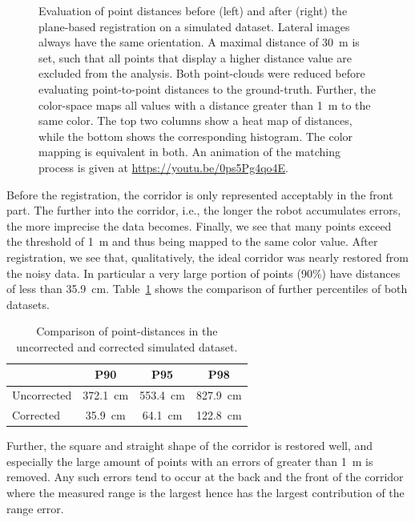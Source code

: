 \begin{figure}
\begin{minipage}[c]{0.495\textwidth}
  	\end{minipage} 	
 	\caption{Evaluation of point distances before (left) and after (right) the plane-based registration on a simulated dataset. Lateral images always have the same orientation. A maximal distance of \SI{30}{m} is set, such that all points that display a higher distance value are excluded from the analysis. Both point-clouds were reduced before evaluating point-to-point distances to the ground-truth. Further, the color-space maps all values with a distance greater than \SI{1}{m} to the same color. The top two columns show a heat map of distances, while the bottom shows the corresponding histogram. The color mapping is equivalent in both. An animation of the matching process is given at \url{https://youtu.be/0ps5Pg4qo4E}.} 
 	\label{fig:simulatedEvaluation}
\end{figure} 

Before the registration, the corridor is only represented acceptably in the front part. 
The further into the corridor, i.e., the longer the robot accumulates errors, the more imprecise the data becomes. 
Finally, we see that many points exceed the threshold of \SI{1}{\meter} and thus being mapped to the same color value.
After registration, we see that, qualitatively, the ideal corridor was nearly restored from the noisy data. 
In particular a very large portion of points (90\%) have distances of less than \SI{35.9}{\centi\meter}.
Table~\ref{tab:percentiles} shows the comparison of further percentiles of both datasets. 

\begin{table}
	\centering
	\begin{tabular}{@{}lccc@{}}\hline
		& P90 & P95 & P98 \\ \hline\hline
		Uncorrected & \SI{372.1}{\centi\meter} &  \SI{553.4}{\centi\meter} &  \SI{827.9}{\centi\meter} \\%
		Corrected & \SI{35.9}{\centi\meter} &  \SI{64.1}{\centi\meter} &  \SI{122.8}{\centi\meter} \\\hline%
	\end{tabular}
	\caption{Comparison of point-distances in the uncorrected and corrected simulated dataset.}
	\label{tab:percentiles}
\end{table}

Further, the square and straight shape of the corridor is restored well, and especially the large amount of points with an errors of greater than \SI{1}{m} is removed. 
Any such errors tend to occur at the back and the front of the corridor where the measured range is the largest hence has the largest contribution of the range error. 

